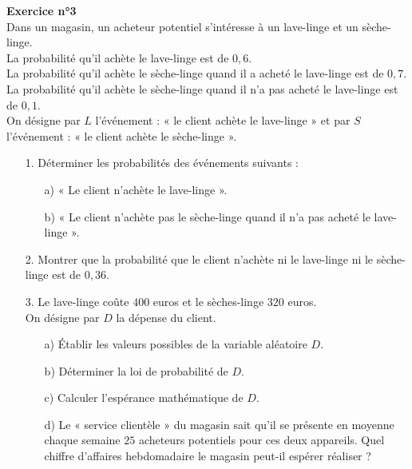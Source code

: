 \newpage


\textbf{Exercice n°3} \\

Dans un magasin, un acheteur potentiel s'intéresse à un lave-linge et un sèche-linge. \\

La probabilité qu'il achète le lave-linge est de $0,6$. \\
La probabilité qu'il achète le sèche-linge quand il a acheté le lave-linge est de $0,7$. \\
La probabilité qu'il achète le sèche-linge quand il n'a pas acheté le lave-linge est de $0,1$. \\

On désigne par $L$ l'événement : « le client achète le lave-linge » et par $S$ l'événement : « le client achète le sèche-linge ». \\

\begin{itemize}
\item[1.] Déterminer les probabilités des événements suivants : \\
\begin{itemize}
\item[a)] « Le client n'achète le lave-linge ». 
\item[b)] « Le client n'achète pas le sèche-linge quand il n'a pas acheté le lave-linge ». \\
\end{itemize}
\item[2.] Montrer que la probabilité que le client n'achète ni le lave-linge ni le sèche-linge est de $0,36$. \\
\item[3.] Le lave-linge coûte $400$ euros et le sèches-linge $320$ euros. \\ On désigne par $D$ la dépense du client. \\
\begin{itemize}
\item[a)] Établir les valeurs possibles de la variable aléatoire $D$.
\item[b)] Déterminer la loi de probabilité de $D$.
\item[c)] Calculer l'espérance mathématique de $D$.
\item[d)] Le « service clientèle » du magasin sait qu'il se présente en moyenne chaque semaine $25$ acheteurs potentiels pour ces deux appareils. Quel chiffre d'affaires hebdomadaire le magasin peut-il espérer réaliser ?
\end{itemize} 
\end{itemize}

